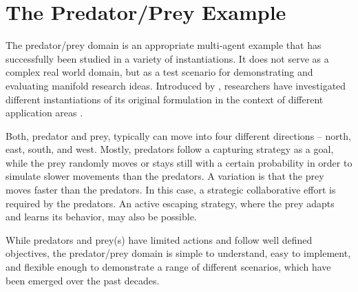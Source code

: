 \section{The Predator/Prey Example}
\label{section:the-predator-prey-example}

The predator/prey domain is an appropriate multi-agent example that has successfully been studied in a variety of instantiations. It does not serve as a complex real world domain, but as a test scenario for demonstrating and evaluating manifold research ideas. Introduced by \cite{BJD86}, researchers have investigated different instantiations of its original formulation in the context of different application areas \cite{SV00}. 

Both, predator and prey, typically can move into four different directions -- north, east, south, and west. Mostly, predators follow a capturing strategy as a goal, while the prey randomly moves or stays still with a certain probability in order to simulate slower movements than the predators. A variation is that the prey moves faster than the predators. In this case, a strategic collaborative effort is required by the predators. An active escaping strategy, where the prey adapts and learns its behavior, may also be possible.



While predators and prey(s) have limited actions and follow well defined objectives, the predator/prey domain is simple to understand, easy to implement, and flexible enough to demonstrate a range of different scenarios, which have been emerged over the past decades. %

